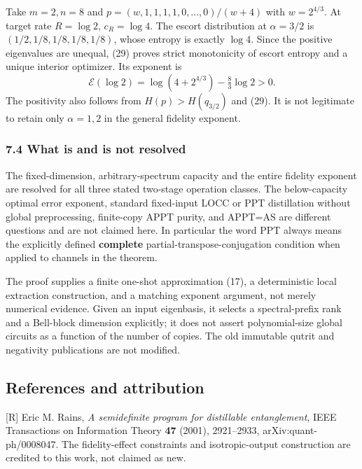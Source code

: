 \documentclass[11pt]{article}
\begin{document}
Take \(m=2,n=8\) and \(p=(w,1,1,1,1,0,\ldots,0)/(w+4)\) with \(w=2^{4/3}\). At target rate \(R=\log2\), \(c_R=\log4\). The escort distribution at \(\alpha=3/2\) is \((1/2,1/8,1/8,1/8,1/8)\), whose entropy is exactly \(\log4\). Since the positive eigenvalues are unequal, (29) proves strict monotonicity of escort entropy and a unique interior optimizer. Its exponent is \[
 \mathcal E(\log2)=\log(4+2^{4/3})-\tfrac83\log2>0.
 \tag{39}
\] The positivity also follows from \(H(p)>H(q_{3/2})\) and (29). It is not legitimate to retain only \(\alpha=1,2\) in the general fidelity exponent.

\hypertarget{what-is-and-is-not-resolved}{%
\subsubsection{7.4 What is and is not resolved}\label{what-is-and-is-not-resolved}}

The fixed-dimension, arbitrary-spectrum capacity and the entire fidelity exponent are resolved for all three stated two-stage operation classes. The below-capacity optimal error exponent, standard fixed-input LOCC or PPT distillation without global preprocessing, finite-copy APPT purity, and APPT=AS are different questions and are not claimed here. In particular the word PPT always means the explicitly defined \textbf{complete} partial-transpose-conjugation condition when applied to channels in the theorem.

The proof supplies a finite one-shot approximation (17), a deterministic local extraction construction, and a matching exponent argument, not merely numerical evidence. Given an input eigenbasis, it selects a spectral-prefix rank and a Bell-block dimension explicitly; it does not assert polynomial-size global circuits as a function of the number of copies. The old immutable qutrit and negativity publications are not modified.

\hypertarget{references-and-attribution}{%
\subsection{References and attribution}\label{references-and-attribution}}

{[}R{]} Eric M. Rains, \emph{A semidefinite program for distillable entanglement}, IEEE Transactions on Information Theory \textbf{47} (2001), 2921--2933, arXiv:quant-ph/0008047. The fidelity-effect constraints and isotropic-output construction are credited to this work, not claimed as new.
\end{document}
